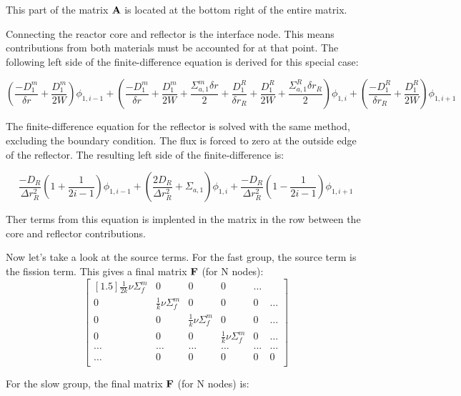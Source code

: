 \documentclass[../main.tex]{subfiles}
\begin{document}
This part of the matrix $\mathbf{A}$ is located at the bottom right of the entire matrix.

	
Connecting the reactor core and reflector is the interface node.  This means contributions from both materials must be accounted for at that point.  The following left side of the finite-difference equation is derived for this special case:

	\begin{equation}
	\left( \frac{-D^m_1}{\delta r} + \frac{D^m_1}{2W} \right) \phi_{1,i-1} + \left( \frac{-D^m_1}{\delta r} + \frac{D^m_1}{2W} + \frac{\Sigma^m_{a,1} \delta r}{2} + \frac{D^R_1}{\delta r_R} + \frac{D^R_1}{2W} + \frac{\Sigma^R_{a,1} \delta r_R}{2} \right) \phi_{1,i} + \left( \frac{-D^R_1}{\delta r_R} + \frac{D^R_1}{2W} \right) \phi_{1,i+1}
	\end{equation}
	
The finite-difference equation for the reflector is solved with the same method, excluding the boundary condition.  The flux is forced to zero at the outside edge of the reflector.  The resulting left side of the finite-difference is:

	\begin{equation}
	\frac{-D_R}{\Delta r_R^2} \left( 1 + \frac{1}{2i-1} \right) \phi_{1,i-1} + \left( \frac{2D_R}{\Delta r_R^2} + \Sigma_{a,1} \right) \phi_{1,i} + \frac{-D_R}{\Delta r_R^2} \left( 1 - \frac{1}{2i-1} \right) \phi_{1,i+1}
	\end{equation}
	
Ther terms from this equation is implented in the matrix in the row between the core and reflector contributions.

Now let's take a look at the source terms.  For the fast group, the source term  is the fission term.  This gives a final matrix $\mathbf{F}$ (for N nodes):
	\[
	\begin{bmatrix}[1.5]
		\frac{1}{2k} \nu \Sigma^m_f  & 0 & 0 & 0 & \dots\\
		0 & \frac{1}{k} \nu \Sigma^m_f  & 0 & 0 & 0 & \dots \\
		0 & 0 & \frac{1}{k} \nu \Sigma^m_f  & 0 & 0 & \dots\\
		0 & 0 & 0 & \frac{1}{k} \nu \Sigma^m_f  & 0 & \dots \\
		\dots & \dots & \dots & \dots & \dots & \dots \\
		\dots & 0 & 0 & 0 & 0 & 0 \\
	\end{bmatrix}
	\]
	
For the slow group, the final matrix $\mathbf{F}$ (for N nodes) is:
\end{document}
